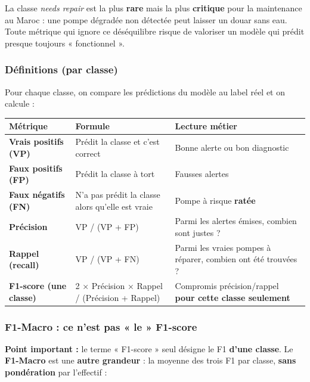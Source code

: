 \documentclass[11pt,a4paper]{report}
\begin{document}
La classe \textit{needs repair} est la plus \textbf{rare} mais la plus \textbf{critique} pour la maintenance au Maroc : une pompe dégradée non détectée peut laisser un douar sans eau. Toute métrique qui ignore ce déséquilibre risque de valoriser un modèle qui prédit presque toujours « fonctionnel ».



\subsubsection{Définitions (par classe)}



Pour chaque classe, on compare les prédictions du modèle au label réel et on calcule :



\begin{longtable}{@{}lll@{}}
\toprule
Métrique & Formule & Lecture métier \\
\midrule
\textbf{Vrais positifs (VP)} & Prédit la classe et c'est correct & Bonne alerte ou bon diagnostic \\
\textbf{Faux positifs (FP)} & Prédit la classe à tort & Fausses alertes \\
\textbf{Faux négatifs (FN)} & N'a pas prédit la classe alors qu'elle est vraie & Pompe à risque \textbf{ratée} \\
\textbf{Précision} & VP / (VP + FP) & Parmi les alertes émises, combien sont justes ? \\
\textbf{Rappel (recall)} & VP / (VP + FN) & Parmi les vraies pompes à réparer, combien ont été trouvées ? \\
\textbf{F1-score (une classe)} & 2 × Précision × Rappel / (Précision + Rappel) & Compromis précision/rappel \textbf{pour cette classe seulement} \\
\bottomrule
\end{longtable}




\subsubsection{F1-Macro : ce n'est pas « le » F1-score}



\textbf{Point important :} le terme « F1-score » seul désigne le F1 \textbf{d'une classe}. Le \textbf{F1-Macro} est une \textbf{autre grandeur} : la moyenne des trois F1 par classe, \textbf{sans pondération} par l'effectif :
\end{document}

